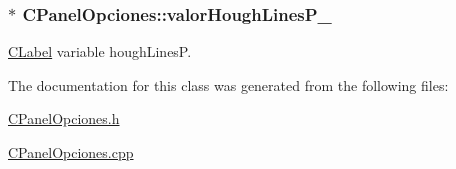 \subsubsection[{\texorpdfstring{valor\+Hough\+Lines\+P\+\_\+}{valorHoughLinesP_}}]{$\ast$ C\+Panel\+Opciones\+::valor\+Hough\+Lines\+P\+\_\+\hspace{0.3cm}{\ttfamily [private]}}\hypertarget{classCPanelOpciones_ab415dcfa099eb5bc1fe6e576fe50e4ca}{}\label{classCPanelOpciones_ab415dcfa099eb5bc1fe6e576fe50e4ca}


\hyperlink{classCLabel}{C\+Label} variable hough\+LinesP. 



The documentation for this class was generated from the following files\+:\begin{DoxyCompactItemize}
\item 
\hyperlink{CPanelOpciones_8h}{C\+Panel\+Opciones.\+h}\item 
\hyperlink{CPanelOpciones_8cpp}{C\+Panel\+Opciones.\+cpp}\end{DoxyCompactItemize}
